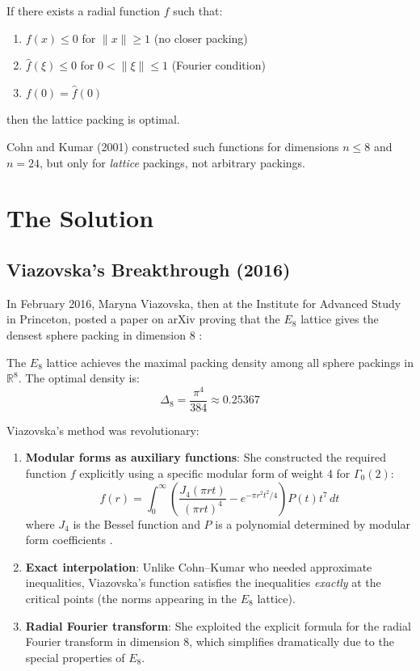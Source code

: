 \begin{theorem}
If there exists a radial function $f$ such that:
\begin{enumerate}
\item $f(x) \leq 0$ for $\|x\| \geq 1$ (no closer packing)
\item $\hat{f}(\xi) \leq 0$ for $0 < \|\xi\| \leq 1$ (Fourier condition)
\item $f(0) = \hat{f}(0)$
\end{enumerate}
then the lattice packing is optimal.
\end{theorem}

Cohn and Kumar (2001) constructed such functions for dimensions $n \leq 8$ and $n = 24$, but only for \emph{lattice} packings, not arbitrary packings.

\section{The Solution}

\subsection{Viazovska's Breakthrough (2016)}

In February 2016, Maryna Viazovska, then at the Institute for Advanced Study in Princeton, posted a paper on arXiv proving that the $E_8$ lattice gives the densest sphere packing in dimension 8 \cite{viazovska2017}:

\begin{theorem}
The $E_8$ lattice achieves the maximal packing density among all sphere packings in $\mathbb{R}^8$. The optimal density is:
\begin{equation}
\Delta_8 = \frac{\pi^4}{384} \approx 0.25367
\end{equation}
\end{theorem}

Viazovska's method was revolutionary:

\begin{enumerate}
\item \textbf{Modular forms as auxiliary functions}: She constructed the required function $f$ explicitly using a specific modular form of weight 4 for $\Gamma_0(2)$:
\begin{equation}
f(r) = \int_0^\infty \left(\frac{J_4(\pi r t)}{(\pi r t)^4} - e^{-\pi r^2 t^2/4}\right) P(t) t^7 \, dt
\end{equation}
where $J_4$ is the Bessel function and $P$ is a polynomial determined by modular form coefficients \cite{viazovska2017}.
\item \textbf{Exact interpolation}: Unlike Cohn--Kumar who needed approximate inequalities, Viazovska's function satisfies the inequalities \emph{exactly} at the critical points (the norms appearing in the $E_8$ lattice).
\item \textbf{Radial Fourier transform}: She exploited the explicit formula for the radial Fourier transform in dimension 8, which simplifies dramatically due to the special properties of $E_8$.
\end{enumerate}

